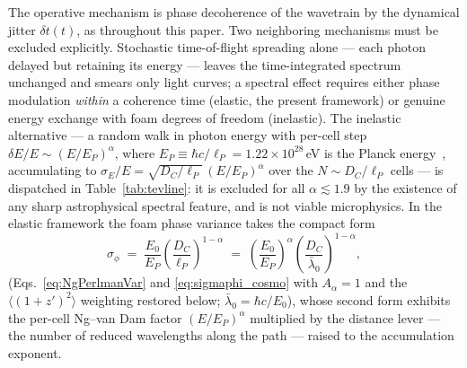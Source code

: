 \documentclass[aps,prd,onecolumn,amsmath,amssymb]{revtex4-2}
\begin{document}
The operative mechanism is phase decoherence of the wavetrain by the
dynamical jitter $\delta t(t)$, as throughout this paper.  Two
neighboring mechanisms must be excluded explicitly.  Stochastic
time-of-flight spreading alone --- each photon delayed but retaining
its energy --- leaves the time-integrated spectrum unchanged and
smears only light curves; a spectral effect requires either phase
modulation \emph{within} a coherence time (elastic, the present
framework) or genuine energy exchange with foam degrees of freedom
(inelastic).  The inelastic alternative --- a random walk in photon
energy with per-cell step $\delta E/E\sim(E/E_P)^\alpha$, where
$E_P\equiv\hbar c/\ell_P=1.22\times10^{28}$\,eV is the Planck
energy~\cite{NgvanDam2000,AmelinoCamelia2013}, accumulating to
$\sigma_E/E=\sqrt{D_C/\ell_P}\,(E/E_P)^\alpha$ over the
$N\sim D_C/\ell_P$ cells --- is dispatched in
Table~\ref{tab:tevline}: it is excluded for all $\alpha\lesssim1.9$
by the existence of any sharp astrophysical spectral feature, and is
not viable microphysics.  In the elastic framework the foam phase
variance takes the compact form
\begin{equation}
  \sigma_\phi
  \;=\; \frac{E_0}{E_P}\left(\frac{D_C}{\ell_P}\right)^{\!1-\alpha}
  \;=\; \left(\frac{E_0}{E_P}\right)^{\!\alpha}
        \left(\frac{D_C}{\bar\lambda_0}\right)^{\!1-\alpha},
  \label{eq:tevline_sigmaphi}
\end{equation}
(Eqs.~\eqref{eq:NgPerlmanVar} and \eqref{eq:sigmaphi_cosmo} with
$A_\alpha=1$ and the $\langle(1+z')^2\rangle$ weighting restored
below; $\bar\lambda_0=\hbar c/E_0$), whose second form exhibits the
per-cell Ng--van Dam factor $(E/E_P)^\alpha$ multiplied by the
distance lever --- the number of reduced wavelengths along the path
--- raised to the accumulation exponent.
\end{document}
